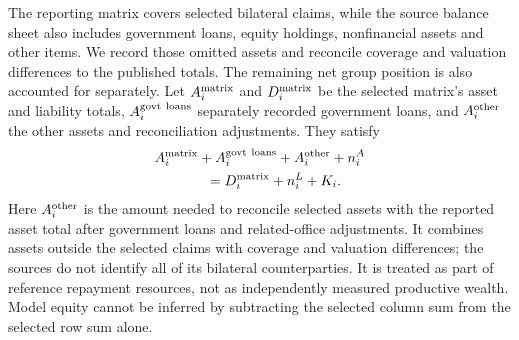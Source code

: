 The reporting matrix covers selected bilateral claims, while the source balance sheet also includes government loans, equity holdings, nonfinancial assets and other items. We record those omitted assets and reconcile coverage and valuation differences to the published totals. The remaining net group position is also accounted for separately. Let $A_i^{\rm matrix}$ and $D_i^{\rm matrix}$ be the selected matrix's asset and liability totals, $A_i^{\rm govt\ loans}$ separately recorded government loans, and $A_i^{\rm other}$ the other assets and reconciliation adjustments. They satisfy
\begin{align}
 &A_i^{\rm matrix}+A_i^{\rm govt\ loans}
       +A_i^{\rm other}+n_i^A \notag\\
 &\hspace{1.3cm}=D_i^{\rm matrix}+n_i^L+K_i.
 \label{eq:full-resource-bridge}
\end{align}
Here $A_i^{\rm other}$ is the amount needed to reconcile selected assets with the reported asset total after government loans and related-office adjustments. It combines assets outside the selected claims with coverage and valuation differences; the sources do not identify all of its bilateral counterparties. It is treated as part of reference repayment resources, not as independently measured productive wealth. Model equity cannot be inferred by subtracting the selected column sum from the selected row sum alone.

